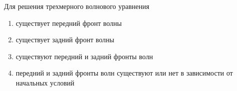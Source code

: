 Для решения трехмерного волнового уравнения

\begin{enumerate}[label=\arabic*)]
    \item существует передний фронт волны
    \item существует задний фронт волны
    \item существуют передний и задний фронты волн
    \item передний и задний фронты волн существуют или нет в зависимости от начальных условий
\end{enumerate}

